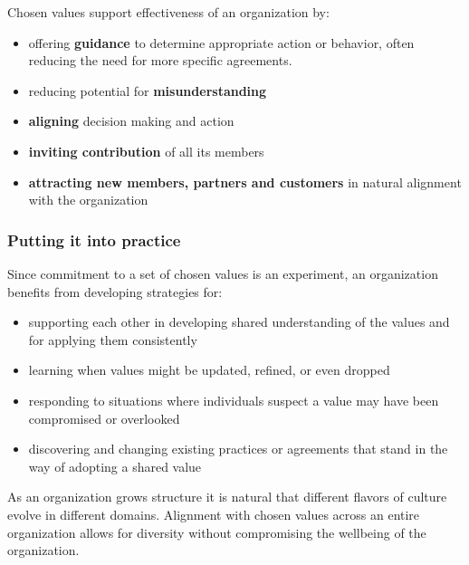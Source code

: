 Chosen values support effectiveness of an organization by:

\begin{itemize}
\item offering \textbf{guidance} to determine appropriate action or behavior, often reducing the need for more specific agreements.

\item reducing potential for \textbf{misunderstanding}

\item \textbf{aligning} decision making and action

\item \textbf{inviting contribution} of all its members

\item \textbf{attracting new members, partners and customers} in natural alignment with the organization

\end{itemize}

\subsubsection{Putting it into practice}
\label{puttingitintopractice}

Since commitment to a set of chosen values is an experiment, an organization benefits from developing strategies for:

\begin{itemize}
\item supporting each other in developing shared understanding of the values and for applying them consistently

\item learning when values might be updated, refined, or even dropped

\item responding to situations where individuals suspect a value may have been compromised or overlooked

\item discovering and changing existing practices or agreements that stand in the way of adopting a shared value

\end{itemize}

As an organization grows structure it is natural that different flavors of culture evolve in different domains. Alignment with chosen values across an entire organization allows for diversity without compromising the wellbeing of the organization.


